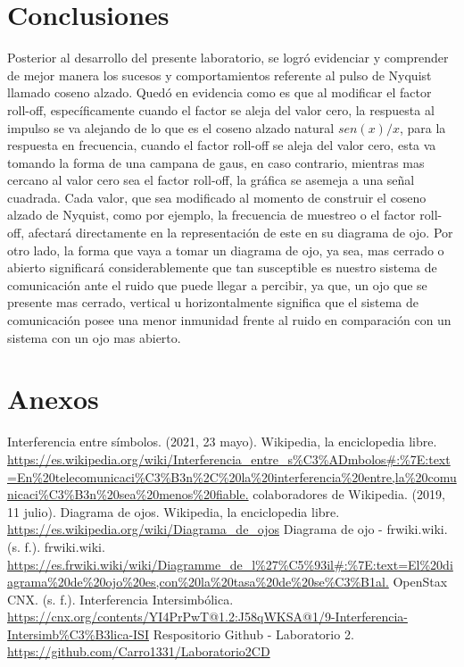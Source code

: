 \documentclass[lettersize,journal]{IEEEtran}
\begin{document}
\section{Conclusiones}\label{sec:conclusiones}
Posterior al desarrollo del presente laboratorio, se logró evidenciar y comprender de mejor manera los sucesos y comportamientos referente al pulso de Nyquist llamado coseno alzado. Quedó en evidencia como es que al modificar el factor roll-off, específicamente cuando el factor se aleja del valor cero, la respuesta al impulso se va alejando de lo que es el coseno alzado natural $sen(x)/x$, para la respuesta en frecuencia, cuando el factor roll-off se aleja del valor cero, esta va tomando la forma de una campana de gaus, en caso contrario, mientras mas cercano al valor cero sea el factor roll-off, la gráfica se asemeja a una señal cuadrada.
\newline \newline
Cada valor, que sea modificado al momento de construir el coseno alzado de Nyquist, como por ejemplo, la frecuencia de muestreo o el factor roll-off, afectará directamente en la representación de este en su diagrama de ojo. Por otro lado, la forma que vaya a tomar un diagrama de ojo, ya sea, mas cerrado o abierto significará considerablemente que tan susceptible es nuestro sistema de comunicación ante el ruido que puede llegar a percibir, ya que, un ojo que se presente mas cerrado, vertical u horizontalmente significa que el sistema de comunicación posee una menor inmunidad frente al ruido en comparación con un sistema con un ojo mas abierto.    
\newpage

\section{Anexos}\label{sec:anexo}


\begin{thebibliography}{}
    Interferencia entre símbolos. (2021, 23 mayo). Wikipedia, la enciclopedia libre.  \url{https://es.wikipedia.org/wiki/Interferencia\_entre\_s\%C3\%ADmbolos\#:\%7E:text=En\%20telecomunicaci\%C3\%B3n\%2C\%20la\%20interferencia\%20entre,la\%20comunicaci\%C3\%B3n\%20sea\%20menos\%20fiable.}
      colaboradores de Wikipedia. (2019, 11 julio). Diagrama de ojos. Wikipedia, la enciclopedia libre. \url{https://es.wikipedia.org/wiki/Diagrama\_de\_ojos}
      Diagrama de ojo - frwiki.wiki. (s. f.). frwiki.wiki. \url{https://es.frwiki.wiki/wiki/Diagramme\_de\_l\%27\%C5\%93il\#:\%7E:text=El\%20diagrama\%20de\%20ojo\%20es,con\%20la\%20tasa\%20de\%20se\%C3\%B1al.}
  OpenStax CNX. (s. f.). Interferencia Intersimbólica. \url{https://cnx.org/contents/YI4PrPwT@1.2:J58qWKSA@1/9-Interferencia-Intersimb\%C3\%B3lica-ISI}
 Respositorio Github - Laboratorio 2. 
\url{https://github.com/Carro1331/Laboratorio2CD}



      


\end{thebibliography}



\end{document}
